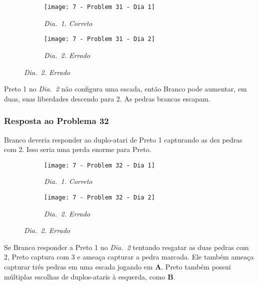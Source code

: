 \begin{figure}[h!]
    \centering
    \begin{subfigure}[t]{.425\textwidth}
        \texttt{[image: 7 - Problem 31 - Dia 1]}
        \captionsetup{justification=centering}
        \caption*{\emph{Dia.\@~1. Correto}}
    \end{subfigure}
    \hspace{1cm}
    \begin{subfigure}[t]{.425\textwidth}
        \texttt{[image: 7 - Problem 31 - Dia 2]}
        \captionsetup{justification=centering}
        \caption*{\emph{Dia.\@~2. Errado}}
    \end{subfigure}
\end{figure}

Preto 1 no \emph{Dia.\@~2} não configura uma escada, então Branco pode aumentar, em duas, suas liberdades descendo para 2. As pedras brancas escapam.

\pagebreak

\subsubsection*{Resposta ao Problema 32}

Branco deveria responder ao duplo-atari de Preto 1 capturando as dez pedras com 2. Isso seria uma perda enorme para Preto.

\begin{figure}[h!]
    \centering
    \begin{subfigure}[t]{.425\textwidth}
        \texttt{[image: 7 - Problem 32 - Dia 1]}
        \captionsetup{justification=centering}
        \caption*{\emph{Dia.\@~1. Correto}}
    \end{subfigure}
    \hspace{1cm}
    \begin{subfigure}[t]{.425\textwidth}
        \texttt{[image: 7 - Problem 32 - Dia 2]}
        \captionsetup{justification=centering}
        \caption*{\emph{Dia.\@~2. Errado}}
    \end{subfigure}
\end{figure}

Se Branco responder a Preto 1 no \emph{Dia.\@~2} tentando resgatar as duas pedras com 2, Preto captura com 3 e ameaça capturar a pedra marcada. Ele também ameaça capturar três pedras em uma escada jogando em \textbf{A}. Preto também possui múltiplas escolhas de duplos-ataris à esquerda, como \textbf{B}.

